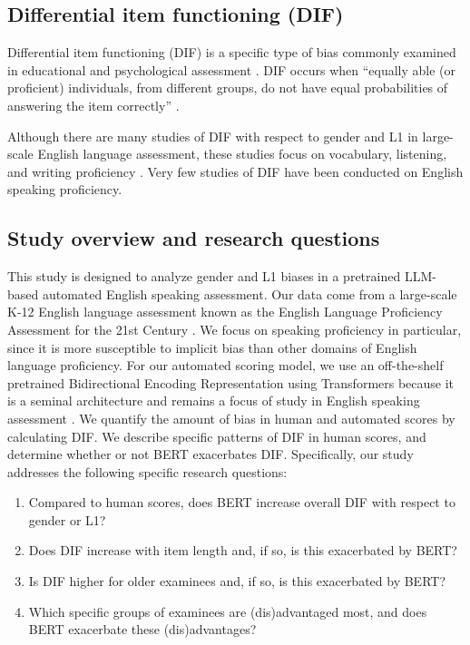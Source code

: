 \documentclass [PhD] {uclathes}
\begin{document}
\subsection{Differential item functioning (DIF)}
\label{intro_dif}

Differential item functioning (DIF) is a specific type of bias commonly examined in educational and psychological assessment \citep{aera2014}. DIF occurs when “equally able (or proficient) individuals, from different groups, do not have equal probabilities of answering the item correctly” \citep[][p. 4]{angoff1993}. 

Although there are many studies of DIF with respect to gender and L1 in large-scale English language assessment, these studies focus on vocabulary, listening, and writing proficiency \citep{kunnan2017evaluating}. Very few studies of DIF have been conducted on English speaking proficiency. 

\subsection{Study overview and research questions}

This study is designed to analyze gender and L1 biases in a pretrained LLM-based automated English speaking assessment. Our data come from a large-scale K-12 English language assessment known as the English Language Proficiency Assessment for the 21st Century \citep[ELPA21;][]{huang2018english}. We focus on speaking proficiency in particular, since it is more susceptible to implicit bias than other domains of English language proficiency. For our automated scoring model, we use an off-the-shelf pretrained Bidirectional Encoding Representation using Transformers \citep[BERT;][]{devlin2018} because it is a seminal architecture and remains a focus of study in English speaking assessment \citep{wang2021automated}. We quantify the amount of bias in human and automated scores by calculating DIF. We describe specific patterns of DIF in human scores, and determine whether or not BERT exacerbates DIF. Specifically, our study addresses the following specific research questions:

\begin{enumerate}
    \item Compared to human scores, does BERT increase overall DIF with respect to gender or L1?
    \item Does DIF increase with item length and, if so, is this exacerbated by BERT?
    \item Is DIF higher for older examinees and, if so, is this exacerbated by BERT?
    \item Which specific groups of examinees are (dis)advantaged most, and does BERT exacerbate these (dis)advantages?
\end{enumerate}
\end{document}
